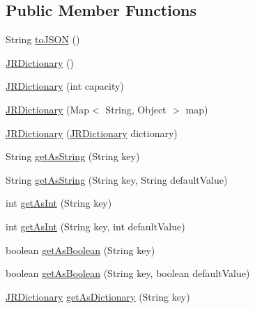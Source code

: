 \subsection*{Public Member Functions}
\begin{DoxyCompactItemize}
\item 
String \hyperlink{classcom_1_1janrain_1_1android_1_1engage_1_1types_1_1_j_r_dictionary_aef3a8f006c122407b52eae2dd371d7d8}{toJSON} ()
\item 
\hyperlink{classcom_1_1janrain_1_1android_1_1engage_1_1types_1_1_j_r_dictionary_aeae42fa50e13cc204509bd73ccece4f4}{JRDictionary} ()
\item 
\hyperlink{classcom_1_1janrain_1_1android_1_1engage_1_1types_1_1_j_r_dictionary_aa3d7a8ac575178e29e78fd444d6d5270}{JRDictionary} (int capacity)
\item 
\hyperlink{classcom_1_1janrain_1_1android_1_1engage_1_1types_1_1_j_r_dictionary_a1eadd9470baf5a639d1466d8e0d5b74a}{JRDictionary} (Map$<$ String, Object $>$ map)
\item 
\hyperlink{classcom_1_1janrain_1_1android_1_1engage_1_1types_1_1_j_r_dictionary_a4db58ccc199bcc621794e6ccefda22bc}{JRDictionary} (\hyperlink{classcom_1_1janrain_1_1android_1_1engage_1_1types_1_1_j_r_dictionary}{JRDictionary} dictionary)
\item 
String \hyperlink{classcom_1_1janrain_1_1android_1_1engage_1_1types_1_1_j_r_dictionary_a2b77cbd4af5e42574598cb845532bd05}{getAsString} (String key)
\item 
String \hyperlink{classcom_1_1janrain_1_1android_1_1engage_1_1types_1_1_j_r_dictionary_acb888efe418bb9a0b189f33ff018a532}{getAsString} (String key, String defaultValue)
\item 
int \hyperlink{classcom_1_1janrain_1_1android_1_1engage_1_1types_1_1_j_r_dictionary_ab07a0f322cef25e94db12ead90fd9a20}{getAsInt} (String key)
\item 
int \hyperlink{classcom_1_1janrain_1_1android_1_1engage_1_1types_1_1_j_r_dictionary_a4a30b925817eccbf4884eb9e9b7fd224}{getAsInt} (String key, int defaultValue)
\item 
boolean \hyperlink{classcom_1_1janrain_1_1android_1_1engage_1_1types_1_1_j_r_dictionary_acef5ba14e5915410a445e8d8204cd05d}{getAsBoolean} (String key)
\item 
boolean \hyperlink{classcom_1_1janrain_1_1android_1_1engage_1_1types_1_1_j_r_dictionary_a9521921f74fb1035622169be5c0be602}{getAsBoolean} (String key, boolean defaultValue)
\item 
\hyperlink{classcom_1_1janrain_1_1android_1_1engage_1_1types_1_1_j_r_dictionary}{JRDictionary} \hyperlink{classcom_1_1janrain_1_1android_1_1engage_1_1types_1_1_j_r_dictionary_a2e9d69f6fd2f5aa24a8595232be382b8}{getAsDictionary} (String key)

\end{DoxyCompactItemize}
